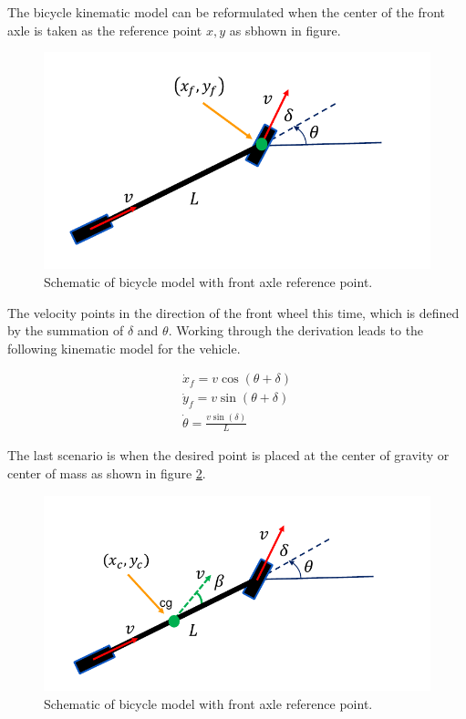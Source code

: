 The bicycle kinematic model can be reformulated when the center of the front axle is taken as the reference point $x, y$ as sbhown in figure. 

\begin{figure}[!htb]
\begin{center}
\includegraphics[scale=0.290]{img/bicycle_model/bicycle_model_4.jpeg}
\end{center}
\caption{Schematic of bicycle model with front axle reference point.}
\label{bicycle_model_4}
\end{figure}


The velocity points in the direction of the front wheel this time, which is defined by the summation of $\delta$ and $\theta$. Working through the derivation leads to the following kinematic model for the vehicle. 

\begin{eqnarray}
\dot{x}_f = v\cos(\theta + \delta) \\
\dot{y}_f = v\sin(\theta + \delta) \\
\dot{\theta} = \frac{v\sin(\delta)}{L}
\end{eqnarray}

The last scenario is when the desired point is placed at the center of gravity or center of mass as shown in figure \ref{bicycle_model_5}. 



\begin{figure}[!htb]
\begin{center}
\includegraphics[scale=0.290]{img/bicycle_model/bicycle_model_5.jpeg}
\end{center}
\caption{Schematic of bicycle model with front axle reference point.}
\label{bicycle_model_5}
\end{figure}

